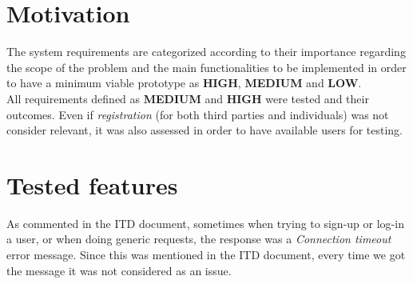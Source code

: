 \documentclass[a4paper, hidelinks, 12pt]{report}
\begin{document}
	\section{Motivation}
	The system requirements are categorized according to their importance regarding the scope of the problem and the main functionalities to be implemented in order to have a minimum viable prototype as \textbf{HIGH}, \textbf{MEDIUM} and \textbf{LOW}. \\

	All requirements defined as \textbf{MEDIUM} and \textbf{HIGH} were tested and their outcomes. Even if \textit{registration} (for both third parties and individuals) was not consider relevant, it was also assessed in order to have available users for testing.

	\section{Tested features}
	As commented in the ITD document, sometimes when trying to sign-up or log-in a user, or when doing generic requests, the response was a \textit{Connection timeout} error message. Since this was mentioned in the ITD document, every time we got the message it was not considered as an issue.
\end{document}
